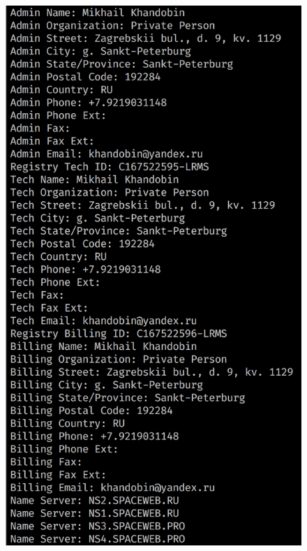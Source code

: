\begin{figure}[ht]
	\centering
	\label{whois}
	\includegraphics[width=\textwidth]{images/whois.png}
	\caption{}
\end{figure}

